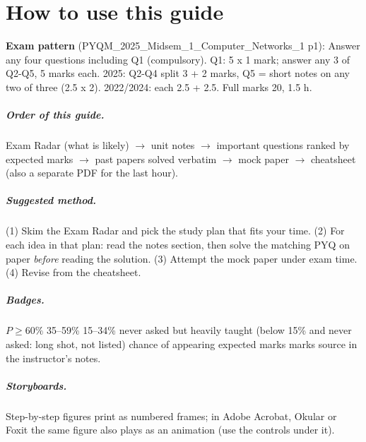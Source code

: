 \chapter{How to use this guide}
\textbf{Exam pattern} (PYQM\_2025\_Midsem\_1\_Computer\_Networks\_1 p1): Answer any four questions including Q1 (compulsory). Q1: 5 x 1 mark; answer any 3 of Q2-Q5, 5 marks each. 2025: Q2-Q4 split 3 + 2 marks, Q5 = short notes on any two of three (2.5 x 2). 2022/2024: each 2.5 + 2.5. Full marks 20, 1.5 h.
\paragraph{Order of this guide.} Exam Radar (what is likely) $\rightarrow$ unit notes $\rightarrow$ important questions ranked by expected marks $\rightarrow$ past papers solved verbatim $\rightarrow$ mock paper $\rightarrow$ cheatsheet (also a separate PDF for the last hour).
\paragraph{Suggested method.} (1) Skim the Exam Radar and pick the study plan that fits your time. (2) For each idea in that plan: read the notes section, then solve the matching PYQ on paper \emph{before} reading the solution. (3) Attempt the mock paper under exam time. (4) Revise from the cheatsheet.
\paragraph{Badges.}  $P\ge60\%$ \quad {} 35--59\% \quad {} 15--34\% \quad {} never asked but heavily taught \quad (below 15\% and never asked: long shot, not listed) \quad {} chance of appearing \quad {} expected marks \quad {} marks \quad {} source in the instructor's notes.
\paragraph{Storyboards.} Step-by-step figures print as numbered frames; in Adobe Acrobat, Okular or Foxit the same figure also plays as an animation (use the controls under it).

